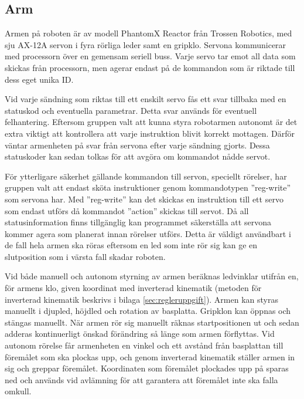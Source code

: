 \subsection{Arm}

Armen på roboten är av modell PhantomX Reactor från Trossen Robotics, med sju AX-12A servon i fyra rörliga leder samt en gripklo. Servona kommunicerar med processorn över en gemensam seriell buss. Varje servo tar emot all data som skickas från processorn, men agerar endast på de kommandon som är riktade till dess eget unika ID.

Vid varje sändning som riktas till ett enskilt servo fås ett svar tillbaka med en statuskod och eventuella parametrar. Detta svar används för eventuell felhantering. Eftersom gruppen valt att kunna styra robotarmen autonomt är det extra viktigt att kontrollera att varje instruktion blivit korrekt mottagen. Därför väntar armenheten på svar från servona efter varje sändning gjorts. Dessa statuskoder kan sedan tolkas för att avgöra om kommandot nådde servot.

För ytterligare säkerhet gällande kommandon till servon, speciellt rörelser, har gruppen valt att endast sköta instruktioner genom kommandotypen ''reg-write'' som servona har. Med ''reg-write'' kan det skickas en instruktion till ett servo som endast utförs då kommandot ''action'' skickas till servot. Då all statusinformation finns tillgänglig kan programmet säkerställa att servona kommer agera som planerat innan rörelser utförs. Detta är väldigt användbart i de fall hela armen ska röras eftersom en led som inte rör sig kan ge en slutposition som i värsta fall skadar roboten.

Vid både manuell och autonom styrning av armen beräknas ledvinklar utifrån en, för armens klo, given koordinat med inverterad kinematik (metoden för inverterad kinematik beskrivs i bilaga \ref{sec:regleruppgift}). Armen kan styras manuellt i djupled, höjdled och rotation av basplatta. Gripklon kan öppnas och stängas manuellt. När armen rör sig manuellt räknas startpositionen ut och sedan adderas kontinuerligt önskad förändring så länge som armen förflyttas. Vid autonom rörelse får armenheten en vinkel och ett avstånd från basplattan till föremålet som ska plockas upp, och genom inverterad kinematik ställer armen in sig och greppar föremålet. Koordinaten som föremålet plockades upp på sparas ned och används vid avlämning för att garantera att föremålet inte ska falla omkull.

